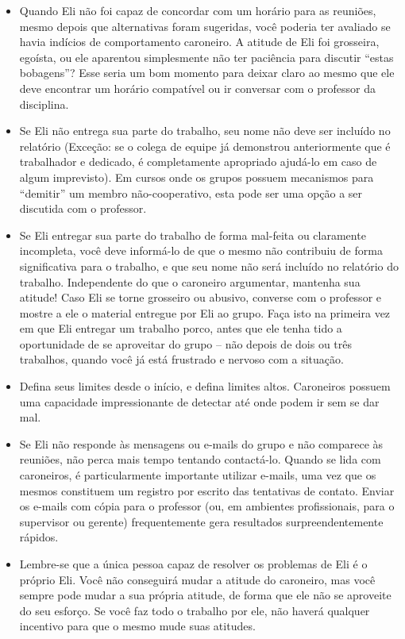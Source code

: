 \documentclass{letter}
\begin{document}
\begin{letter}{}
\begin{itemize}
\item Quando Eli não foi capaz de concordar com um horário para as reuniões, mesmo depois que alternativas foram sugeridas, você poderia ter avaliado se havia indícios de comportamento caroneiro. A atitude de Eli foi grosseira, egoísta, ou ele aparentou simplesmente não ter paciência para discutir ``estas bobagens''? Esse seria um bom momento para deixar claro ao mesmo que ele deve encontrar um horário compatível ou ir conversar com o professor da disciplina.
\item Se Eli não entrega sua parte do trabalho, seu nome não deve ser incluído no relatório (Exceção: se o colega de equipe já demonstrou anteriormente que é trabalhador e dedicado, é completamente apropriado ajudá-lo em caso de algum imprevisto). Em cursos onde os grupos possuem mecanismos para ``demitir'' um membro não-cooperativo, esta pode ser uma opção a ser discutida com o professor.
\item Se Eli entregar sua parte do trabalho de forma mal-feita ou claramente incompleta, você deve informá-lo de que o mesmo não contribuiu de forma significativa para o trabalho, e que seu nome não será incluído no relatório do trabalho. Independente do que o caroneiro argumentar, mantenha sua atitude! Caso Eli se torne grosseiro ou abusivo, converse com o professor e mostre a ele o material entregue por Eli ao grupo. Faça isto na primeira vez em que Eli entregar um trabalho porco, antes que ele tenha tido a oportunidade de se aproveitar do grupo -- não depois de dois ou três trabalhos, quando você já está frustrado e nervoso com a situação.
\item Defina seus limites desde o início, e defina limites altos. Caroneiros possuem uma capacidade impressionante de detectar até onde podem ir sem se dar mal.
\item Se Eli não responde às mensagens ou e-mails do grupo e não comparece às reuniões, não perca mais tempo tentando contactá-lo. Quando se lida com caroneiros, é particularmente importante utilizar e-mails, uma vez que os mesmos constituem um registro por escrito das tentativas de contato. Enviar os e-mails com cópia para o professor (ou, em ambientes profissionais, para o supervisor ou gerente) frequentemente gera resultados surpreendentemente rápidos.
\item Lembre-se que a única pessoa capaz de resolver os problemas de Eli é o próprio Eli. Você não conseguirá mudar a atitude do caroneiro, mas você sempre pode mudar a sua própria atitude, de forma que ele não se aproveite do seu esforço. Se você faz todo o trabalho por ele, não haverá qualquer incentivo para que o mesmo mude suas atitudes.
\end{itemize}


\end{letter}
\end{document}
